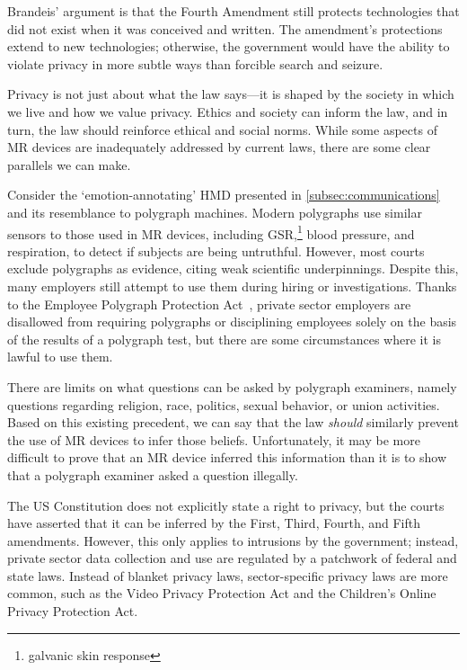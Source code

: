 Brandeis' argument is that the Fourth Amendment still protects technologies that did not exist when it was conceived and written. The amendment's protections extend to new technologies; otherwise, the government would have the ability to violate privacy in more subtle ways than forcible search and seizure.

Privacy is not just about what the law says---it is shaped by the society in which we live and how we value privacy. Ethics and society can inform the law, and in turn, the law should reinforce ethical and social norms. While some aspects of MR devices are inadequately addressed by current laws, there are some clear parallels we can make.

Consider the `emotion-annotating'  HMD presented in \autoref{subsec:communications} and its resemblance to polygraph machines. Modern polygraphs use similar sensors to those used in MR devices, including GSR,\footnote{galvanic skin response} blood pressure, and respiration, to detect if subjects are being untruthful. However, most courts exclude polygraphs as evidence, citing weak scientific underpinnings. Despite this, many employers still attempt to use them during hiring or investigations. Thanks to the Employee Polygraph Protection Act~\cite{polygraph}, private sector employers are disallowed from requiring polygraphs or disciplining employees solely on the basis of the results of a polygraph test, but there are some circumstances where it is lawful to use them.

There are limits on what questions can be asked by polygraph examiners, namely questions regarding religion, race, politics, sexual behavior, or union activities. Based on this existing precedent, we can say that the law \emph{should} similarly prevent the use of MR devices to infer those beliefs. Unfortunately, it may be more difficult to prove that an MR device inferred this information than it is to show that a polygraph examiner asked a question illegally.

The US Constitution does not explicitly state a right to privacy, but the courts have asserted that it can be inferred by the First, Third, Fourth, and Fifth amendments. However, this only applies to intrusions by the government; instead, private sector data collection and use are regulated by a patchwork of federal and state laws. Instead of blanket privacy laws, sector-specific privacy laws are more common, such as the Video Privacy Protection Act and the Children's Online Privacy Protection Act.

